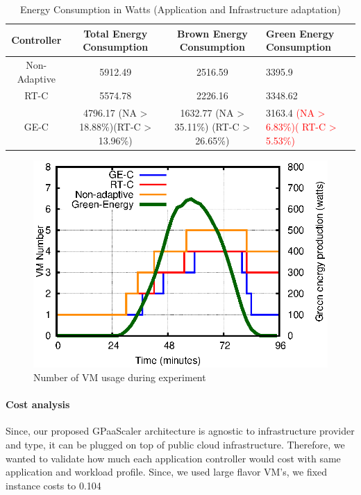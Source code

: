 \begin{table}
\caption{Energy Consumption in Watts (Application and Infrastructure adaptation)}
  \label{tab:watt2}
\begin{tabular}{cccl}
\toprule
Controller & Total Energy Consumption & Brown Energy Consumption & Green Energy Consumption\\
\midrule
Non-Adaptive & 5912.49 & 2516.59 & 3395.9 \\
RT-C & 5574.78 & 2226.16 & 3348.62  \\  %
GE-C & 4796.17 (NA > 18.88\%)(RT-C > 13.96\%) & 1632.77 (NA > 35.11\%) (RT-C > 26.65\%) & 3163.4 \textcolor{red}{(NA > 6.83\%)( RT-C > 5.53\%)} \\
\bottomrule
\end{tabular}
\end{table}

\begin{figure} [htb]
\centering
\includegraphics[scale=.8]{Graphs/vm.eps}
\caption{Number of VM usage during experiment}
\label{fig:vm}
\end{figure}



\paragraph{\textbf{Cost analysis}}

Since, our proposed GPaaScaler architecture is agnostic to infrastructure provider and type, it can be plugged on top of public cloud infrastructure. Therefore, we wanted to validate how much each application controller would cost with same application and workload profile. Since, we used large flavor VM's, we fixed instance costs to 0.104 \textdollar

